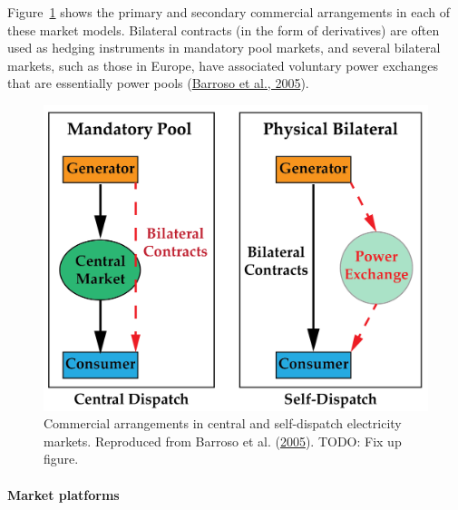 \documentclass[12pt,a4paper,]{report}
\begin{document}
Figure~\ref{fig:market_models} shows the primary and secondary
commercial arrangements in each of these market models. Bilateral
contracts (in the form of derivatives) are often used as hedging
instruments in mandatory pool markets, and several bilateral markets,
such as those in Europe, have associated voluntary power exchanges that
are essentially power pools
(\protect\hyperlink{ref-barrosoClassificationElectricityMarket2005}{Barroso
et al., 2005}).

\begin{figure}
\hypertarget{fig:market_models}{%
\centering
\includegraphics{source/figures/market_models.png}
\caption{Commercial arrangements in central and self-dispatch
electricity markets. Reproduced from Barroso et al.
(\protect\hyperlink{ref-barrosoClassificationElectricityMarket2005}{2005}).
TODO: Fix up figure.}\label{fig:market_models}
}
\end{figure}

\hypertarget{market-platforms}{%
\paragraph{Market platforms}\label{market-platforms}}
\end{document}
